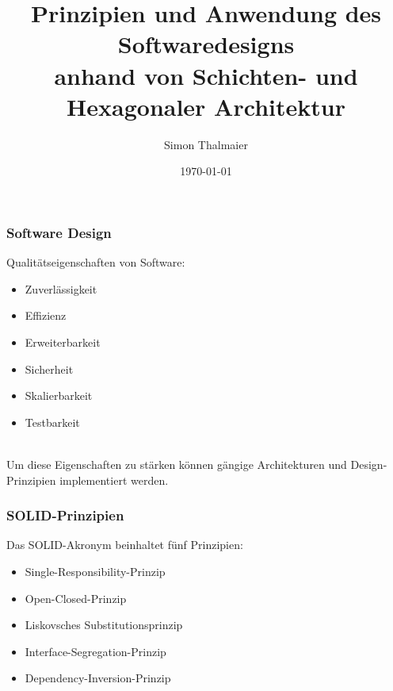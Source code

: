 \documentclass[9pt]{beamer}
\title{
	\fontsize{13}{15}\selectfont Prinzipien und Anwendung des Softwaredesigns \\[5px] 
	\textbf{\color{primary} \fontsize{11}{13}\selectfont anhand von Schichten- und Hexagonaler Architektur} 
}
\author{Simon Thalmaier}
\institute{Informatik Bachelor}
\date{\today}
\def\footerimage{assets/Progress.png}
\begin{document}
\titlepage


\begin{frame}[noframenumbering]
 \frametitle{Software Design}
 
 Qualitätseigenschaften von Software: \\[0.5cm]
 
 \begin{minipage}[b]{0.5\textwidth}
 	
 	\begin{itemize}
 		\item \alert{Zuverlässigkeit}
 		\item \alert{Effizienz}
 		\item \alert{Erweiterbarkeit}
 		\item \alert{Sicherheit}
 		\item \alert{Skalierbarkeit}
 		\item \alert{Testbarkeit}  
 	\end{itemize}
 	
 \end{minipage}
 \\[1cm]
 Um diese Eigenschaften zu stärken können gängige Architekturen und Design-Prinzipien implementiert werden.
 
\end{frame}

\def\footerimage{assets/Progress2.png}
\begin{frame}
	\frametitle{SOLID-Prinzipien}
	
	Das SOLID-Akronym beinhaltet fünf Prinzipien: \\[0.5cm]
	
	\begin{minipage}[b]{0.5\textwidth}
		
		\begin{itemize}
			\item \alert{Single-Responsibility-Prinzip}
			\item \alert{Open-Closed-Prinzip}
			\item \alert{Liskovsches Substitutionsprinzip}
			\item \alert{Interface-Segregation-Prinzip}
			\item \alert{Dependency-Inversion-Prinzip}
		\end{itemize}
		
	\end{minipage}
	\\[1cm]
	
\end{frame}
\end{document}
